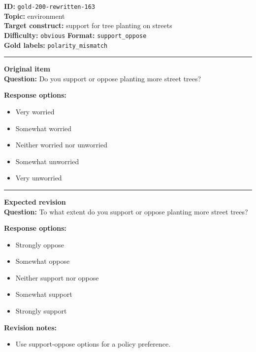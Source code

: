 \documentclass[10pt,a4paper]{article}
\newcommand{\sectionline}{\vspace{0.15em}\hrule\vspace{0.35em}}
\begin{document}
\begin{tcolorbox}[colframe=FlawRed,colback=white,colbacktitle=FlawRed!9,coltitle=black,title={Item 163\hfill Flawed item}]
\textbf{ID:} \texttt{gold-200-rewritten-163}\\
\textbf{Topic:} environment\\
\textbf{Target construct:} support for tree planting on streets\\
\textbf{Difficulty:} \texttt{obvious} \quad \textbf{Format:} \texttt{support\_oppose}\\
\textbf{Gold labels:} \texttt{polarity\_mismatch}\\
\sectionline
\textbf{Original item}\\
\textbf{Question:} Do you support or oppose planting more street trees?
\par\textbf{Response options:}
\begin{itemize}
\item Very worried
\item Somewhat worried
\item Neither worried nor unworried
\item Somewhat unworried
\item Very unworried
\end{itemize}
\sectionline
\textbf{Expected revision}\\
\textbf{Question:} To what extent do you support or oppose planting more street trees?
\par\textbf{Response options:}
\begin{itemize}
\item Strongly oppose
\item Somewhat oppose
\item Neither support nor oppose
\item Somewhat support
\item Strongly support
\end{itemize}
\par\textbf{Revision notes:}
\begin{itemize}
\item Use support-oppose options for a policy preference.
\end{itemize}
\end{tcolorbox}
\end{document}
